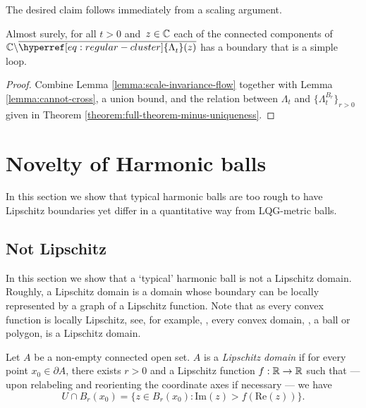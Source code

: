 \documentclass[12pt]{amsart}
\numberwithin{equation}{section}
\renewcommand*{\Re}{\mathrm{Re}}
\renewcommand*{\Im}{\mathrm{Im}}
\newcommand{\cluster}[2]{\hyperref[eq:non-co-set]{\mathit{\Lambda}^{#1}_{#2}}}
\newcommand{\regcluster}[2]{\hyperref[eq:regular-cluster]{\Lambda^{#1}_{#2}}}
\begin{document}
	The desired claim follows immediately from a scaling argument. 
	\begin{prop} \label{prop:boundary-simple-loop-full-cluster}
		Almost surely, for all $t > 0$ and~$z \in \mathbb{C}$ each of the connected components of $\C \backslash \overline{{\regcluster{}{t}}(z)}$
		has a boundary that is a simple loop.
	\end{prop}
	
	\begin{proof}
		Combine Lemma \ref{lemma:scale-invariance-flow} together with Lemma \ref{lemma:cannot-cross},  a union bound, 
		and the relation between ${\regcluster{}{t}}$ and $\{\cluster{B_r}{t}\}_{r > 0}$ given in Theorem \ref{theorem:full-theorem-minus-uniqueness}. 
	\end{proof}
	
	
	
	
	
	\section{Novelty of Harmonic balls} \label{sec:novelty}
	
	
	In this section we show that typical harmonic balls are too rough to have Lipschitz boundaries 
	yet differ in a quantitative way from LQG-metric balls. 
	
	
	
	\subsection{Not Lipschitz} \label{subsec:not-lipschitz}
	In this section we show that a `typical' harmonic ball is not a Lipschitz domain.
	Roughly, a Lipschitz domain is a domain whose boundary can be locally represented
	by a graph of a Lipschitz function. Note that as every convex function is locally Lipschitz, see, for example, 
	\cite[Lemma 1.1.6]{gutierrez}, every convex domain, \eg,  a ball or polygon, is a Lipschitz domain.
	
	\begin{definition} \label{def:lipschitz}
		Let $A$ be a non-empty connected open set. $A$ is a  \emph{Lipschitz domain}
		if for every point $x_0 \in \partial A$, there exists $r > 0$ and a Lipschitz function
		$f: \mathbb{R} \to \mathbb{R}$ such that --- upon relabeling and reorienting the coordinate axes if necessary ---
		we have 
		\[
		U \cap B_r(x_0) = \{ z \in B_r(x_0) : \Im(z) > f(\Re(z)) \}.
		\]
	\end{definition}
	
\end{document}
